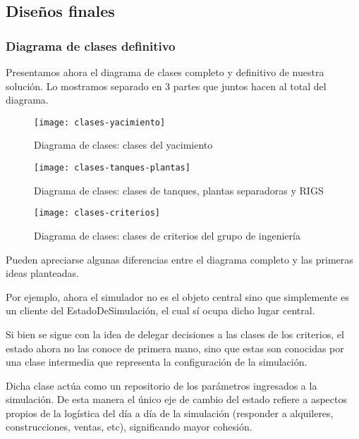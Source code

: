 \subsection{Diseños finales}

\subsubsection{Diagrama de clases definitivo}
Presentamos ahora el diagrama de clases completo y definitivo  de nuestra solución. 
Lo mostramos separado en 3 partes que juntos hacen al total del diagrama. \\

\begin{figure}[H]
\centering
\caption{Diagrama de clases: clases del yacimiento}
\texttt{[image: clases-yacimiento]}
\end{figure}

\newpage
\begin{figure}[H]
\centering
\caption{Diagrama de clases: clases de tanques, plantas separadoras y RIGS}
\texttt{[image: clases-tanques-plantas]}
\end{figure}

\newpage
\begin{figure}[H]
\centering
\caption{Diagrama de clases: clases de criterios del grupo de ingeniería}
\texttt{[image: clases-criterios]}
\end{figure}

Pueden apreciarse algunas diferencias entre el diagrama completo y las primeras 
ideas planteadas.

Por ejemplo, ahora el simulador no es el objeto central sino que simplemente es un cliente del EstadoDeSimulación, el cual sí ocupa dicho lugar central. 

Si bien se sigue con la idea de delegar decisiones a las clases de los criterios, el estado ahora no las conoce de primera mano, sino que estas son conocidas por una clase intermedia que representa la configuración de la simulación. 

Dicha clase actúa como un repositorio de los parámetros ingresados a la simulación. De esta manera el único eje de cambio del estado refiere a aspectos propios de la logística del día a día de la simulación (responder a alquileres, construcciones, ventas, etc), significando mayor cohesión.
\\

